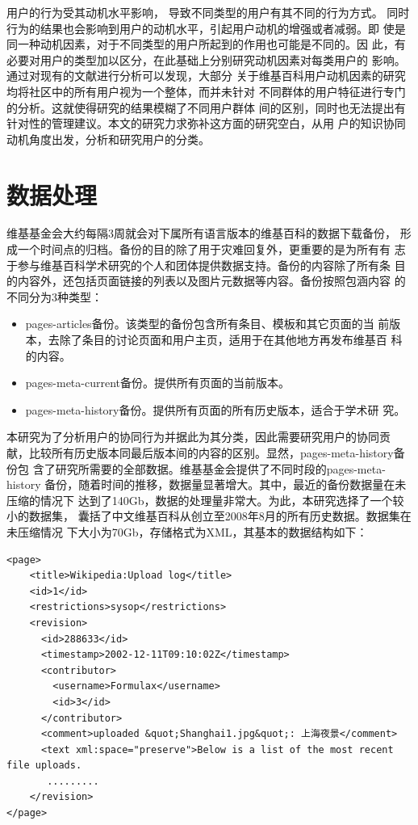用户的行为受其动机水平影响，
导致不同类型的用户有其不同的行为方式。
同时行为的结果也会影响到用户的动机水平，引起用户动机的增强或者减弱。即
使是同一种动机因素，对于不同类型的用户所起到的作用也可能是不同的。因
此，有必要对用户的类型加以区分，在此基础上分别研究动机因素对每类用户的
影响。通过对现有的文献进行分析可以发现，大部分
关于维基百科用户动机因素的研究均将社区中的所有用户视为一个整体，而并未针对
不同群体的用户特征进行专门的分析。这就使得研究的结果模糊了不同用户群体
间的区别，同时也无法提出有针对性的管理建议。本文的研究力求弥补这方面的研究空白，从用
户的知识协同动机角度出发，分析和研究用户的分类。

\section{数据处理}
\label{sec:wikimedia-data}

维基基金会大约每隔3周就会对下属所有语言版本的维基百科的数据下载备份，
形成一个时间点的归档。备份的目的除了用于灾难回复外，更重要的是为所有有
志于参与维基百科学术研究的个人和团体提供数据支持。备份的内容除了所有条
目的内容外，还包括页面链接的列表以及图片元数据等内容。备份按照包涵内容
的不同分为3种类型：
\begin{itemize}
\item pages-articles备份。该类型的备份包含所有条目、模板和其它页面的当
  前版本，去除了条目的讨论页面和用户主页，适用于在其他地方再发布维基百
  科的内容。
\item pages-meta-current备份。提供所有页面的当前版本。
\item pages-meta-history备份。提供所有页面的所有历史版本，适合于学术研
  究。
\end{itemize}

本研究为了分析用户的协同行为并据此为其分类，因此需要研究用户的协同贡
献，比较所有历史版本同最后版本间的内容的区别。显然，pages-meta-history备份包
含了研究所需要的全部数据。维基基金会提供了不同时段的pages-meta-history
备份，随着时间的推移，数据量显著增大。其中，最近的备份数据量在未压缩的情况下
达到了140Gb，数据的处理量非常大。为此，本研究选择了一个较小的数据集，
囊括了中文维基百科从创立至2008年8月的所有历史数据。数据集在未压缩情况
下大小为70Gb，存储格式为XML，其基本的数据结构如下：

\begin{verbatim}
<page>
    <title>Wikipedia:Upload log</title>
    <id>1</id>
    <restrictions>sysop</restrictions>
    <revision>
      <id>288633</id>
      <timestamp>2002-12-11T09:10:02Z</timestamp>
      <contributor>
        <username>Formulax</username>
        <id>3</id>
      </contributor>
      <comment>uploaded &quot;Shanghai1.jpg&quot;: 上海夜景</comment>
      <text xml:space="preserve">Below is a list of the most recent file uploads.
       .........
    </revision>
</page>
\end{verbatim}

